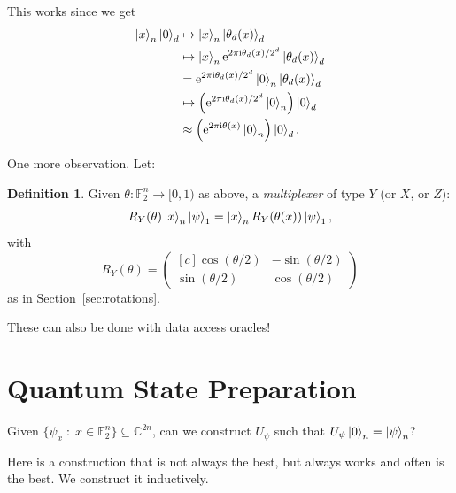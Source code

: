\documentclass[12pt]{amsart}
\theoremstyle{plain}
\theoremstyle{definition}
\newtheorem{definition}[theorem]{Definition}
\theoremstyle{remark}
\newcommand{\F}{\mathbb{F}}
\newcommand{\C}{\mathbb{C}}
\newcommand{\me}{\mathrm{e}}
\newcommand{\mi}{\mathrm{i}}
\newcommand{\st}{\;{:}\;}
\begin{document}
This works since we get
\begin{align*}
  \ket{x}_n \ket{0}_d
  &\mapsto \ket{x}_n \ket{\theta_d(x)}_d \\
  &\mapsto \ket{x}_n \me^{2\pi \mi \theta_d(x)/2^{d}} \ket{\theta_d(x)}_d \\
  &= \me^{2\pi \mi \theta_d(x)/2^{d}} \ket{0}_n \ket{\theta_d(x)}_d \\
  &\mapsto \left(\me^{2\pi \mi \theta_d(x)/2^{d}} \ket{0}_n\right) \ket{0}_d \\
  &\approx \left(\me^{2\pi \mi \theta(x)} \ket{0}_n\right) \ket{0}_d.
\end{align*}


One more observation.  Let:

\begin{definition}
  Given $\theta : \F_2^n \to [0, 1)$ as above, a \emph{multiplexer} of type $Y$ (or $X$, or $Z$):
  \[
    R_Y(\theta) \ket{x}_n \ket{\psi}_1 = \ket{x}_n R_Y(\theta(x)) \ket{\psi}_1,
  \]
  with
  \[
    R_Y(\theta) = \begin{pmatrix*}[c]
      \cos(\theta/2) & -\sin(\theta/2) \\
      \sin(\theta/2) & \cos(\theta/2)
    \end{pmatrix*}
  \]
  as in Section~\ref{sec:rotations}.
\end{definition}

These can also be done with data access oracles!



\section{Quantum State Preparation}


Given $\{ \psi_x \st x \in \F_2^n \} \subseteq \C^{2n}$, can we construct $U_\psi$ such that $U_\psi \ket{0}_n = \ket{\psi}_n$?

Here is a construction that is not always the best, but always works and often is the best.  We construct it inductively.
\end{document}
